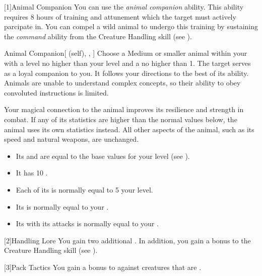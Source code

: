         [1]{Animal Companion}
        You can use the \textit{animal companion} ability.
        This ability requires 8 hours of training and attunement which the target must actively parcipate in.
        You can compel a wild animal to undergo this training by sustaining the \textit{command} ability from the Creature Handling skill (see ).
        \begin{attuneability}{Animal Companion}[ (self), , ]
            Choose a Medium or smaller animal  within your  with a level no higher than your level and a  no higher than 1.
            The target serves as a loyal companion to you.
            It follows your directions to the best of its ability.
            Animals are unable to understand complex concepts, so their ability to obey convoluted instructions is limited.

            Your magical connection to the animal improves its resilience and strength in combat.
            If any of its statistics are higher than the normal values below, the animal uses its own statistics instead.
            All other aspects of the animal, such as its speed and natural weapons, are unchanged.
            \begin{itemize}
                \item Its  and  are equal to the base values for your level (see ).
                \item It has 10 .
                \item Each of its  is normally equal to 5 \add your level.
                \item Its  is normally equal to your  .
                \item Its  with its attacks is normally equal to your  .
            \end{itemize}
        \end{attuneability}

        [2]{Handling Lore} You gain two additional .
        In addition, you gain a  bonus to the Creature Handling skill (see ).

        [3]{Pack Tactics} You gain a  bonus to  against creatures that are .

